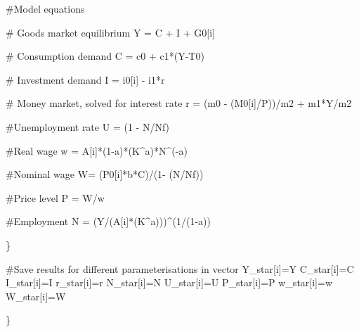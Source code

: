 \documentclass[
  letterpaper,
  DIV=11,
  numbers=noendperiod]{scrreprt}
\newenvironment{Shaded}{\begin{snugshade}}{\end{snugshade}}
\newcommand{\CommentTok}[1]{\textcolor[rgb]{0.37,0.37,0.37}{#1}}
\newcommand{\DecValTok}[1]{\textcolor[rgb]{0.68,0.00,0.00}{#1}}
\newcommand{\NormalTok}[1]{\textcolor[rgb]{0.00,0.23,0.31}{#1}}
\newcommand{\OtherTok}[1]{\textcolor[rgb]{0.00,0.23,0.31}{#1}}
\newcommand{\SpecialCharTok}[1]{\textcolor[rgb]{0.37,0.37,0.37}{#1}}
\begin{document}
\begin{Shaded}
\begin{Highlighting}[]
    \CommentTok{\#Model equations}
    
    \CommentTok{\# Goods market equilibrium}
\NormalTok{    Y }\OtherTok{=}\NormalTok{ C }\SpecialCharTok{+}\NormalTok{ I }\SpecialCharTok{+}\NormalTok{ G0[i]}
    
    \CommentTok{\# Consumption demand}
\NormalTok{    C }\OtherTok{=}\NormalTok{ c0 }\SpecialCharTok{+}\NormalTok{ c1}\SpecialCharTok{*}\NormalTok{(Y}\SpecialCharTok{{-}}\NormalTok{T0)}
    
    \CommentTok{\# Investment demand}
\NormalTok{    I }\OtherTok{=}\NormalTok{ i0[i] }\SpecialCharTok{{-}}\NormalTok{ i1}\SpecialCharTok{*}\NormalTok{r}
    
    \CommentTok{\# Money market, solved for interest rate}
\NormalTok{    r }\OtherTok{=}\NormalTok{ (m0 }\SpecialCharTok{{-}}\NormalTok{ (M0[i]}\SpecialCharTok{/}\NormalTok{P))}\SpecialCharTok{/}\NormalTok{m2 }\SpecialCharTok{+}\NormalTok{ m1}\SpecialCharTok{*}\NormalTok{Y}\SpecialCharTok{/}\NormalTok{m2}
    
    \CommentTok{\#Unemployment rate}
\NormalTok{    U }\OtherTok{=}\NormalTok{ (}\DecValTok{1} \SpecialCharTok{{-}}\NormalTok{ N}\SpecialCharTok{/}\NormalTok{Nf)}
    
    \CommentTok{\#Real wage }
\NormalTok{    w }\OtherTok{=}\NormalTok{ A[i]}\SpecialCharTok{*}\NormalTok{(}\DecValTok{1}\SpecialCharTok{{-}}\NormalTok{a)}\SpecialCharTok{*}\NormalTok{(K}\SpecialCharTok{\^{}}\NormalTok{a)}\SpecialCharTok{*}\NormalTok{N}\SpecialCharTok{\^{}}\NormalTok{(}\SpecialCharTok{{-}}\NormalTok{a)}
    
    \CommentTok{\#Nominal wage }
\NormalTok{    W}\OtherTok{=}\NormalTok{ (P0[i]}\SpecialCharTok{*}\NormalTok{b}\SpecialCharTok{*}\NormalTok{C)}\SpecialCharTok{/}\NormalTok{(}\DecValTok{1}\SpecialCharTok{{-}}\NormalTok{ (N}\SpecialCharTok{/}\NormalTok{Nf))}
    
    \CommentTok{\#Price level }
\NormalTok{    P }\OtherTok{=}\NormalTok{ W}\SpecialCharTok{/}\NormalTok{w}
    
    \CommentTok{\#Employment }
\NormalTok{    N }\OtherTok{=}\NormalTok{ (Y}\SpecialCharTok{/}\NormalTok{(A[i]}\SpecialCharTok{*}\NormalTok{(K}\SpecialCharTok{\^{}}\NormalTok{a)))}\SpecialCharTok{\^{}}\NormalTok{(}\DecValTok{1}\SpecialCharTok{/}\NormalTok{(}\DecValTok{1}\SpecialCharTok{{-}}\NormalTok{a))}

\NormalTok{\}}
  
  \CommentTok{\#Save results for different parameterisations in vector}
\NormalTok{  Y\_star[i]}\OtherTok{=}\NormalTok{Y}
\NormalTok{  C\_star[i]}\OtherTok{=}\NormalTok{C}
\NormalTok{  I\_star[i]}\OtherTok{=}\NormalTok{I}
\NormalTok{  r\_star[i]}\OtherTok{=}\NormalTok{r}
\NormalTok{  N\_star[i]}\OtherTok{=}\NormalTok{N}
\NormalTok{  U\_star[i]}\OtherTok{=}\NormalTok{U}
\NormalTok{  P\_star[i]}\OtherTok{=}\NormalTok{P}
\NormalTok{  w\_star[i]}\OtherTok{=}\NormalTok{w}
\NormalTok{  W\_star[i]}\OtherTok{=}\NormalTok{W}

\NormalTok{\}}
\end{Highlighting}
\end{Shaded}
\end{document}
